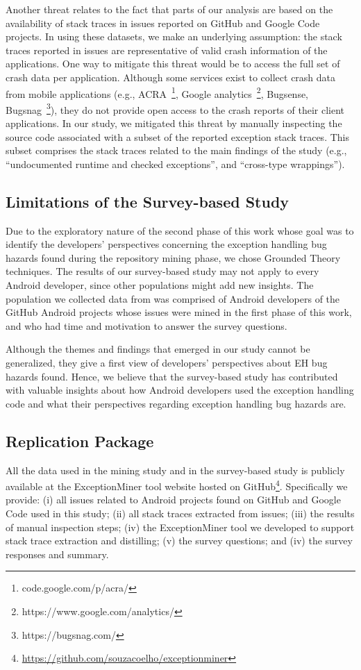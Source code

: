 Another threat relates to the fact that parts of our analysis 
are based on the availability of stack traces in issues reported on GitHub and Google Code projects. 
In using these datasets, we make an underlying assumption: the stack traces reported in issues are 
representative of valid crash information of the applications. 
One way to mitigate this threat would be to access the full 
set of crash data per application. Although some services exist 
to collect crash data from mobile applications (e.g., ACRA~\footnote{code.google.com/p/acra/},  Google analytics~\footnote{https://www.google.com/analytics/}, Bugsense, Bugsnag~\footnote{https://bugsnag.com/}),
they do not provide open access to the crash reports of their client applications.
In our study, we mitigated this threat by manually inspecting
the source code associated with a subset of the reported exception stack traces.
This subset comprises the stack traces related to the main findings 
of the study (e.g., ``undocumented runtime and checked exceptions'',
and ``cross-type wrappings'').

\subsection{Limitations of the Survey-based Study}
Due to the exploratory nature of the second phase of this work whose 
goal was to identify the developers' perspectives concerning the exception 
handling bug hazards found during the repository mining 
phase, we chose Grounded Theory techniques. The results of our
survey-based study may not apply to every Android developer, since other populations 
might add new insights.  The population we collected data from was comprised 
of Android developers of the GitHub 
Android projects whose issues were mined in the first phase of this work, and who had
time and motivation to answer the survey questions.

Although the themes and findings that emerged in our study cannot 
be generalized, they give a first view of developers' perspectives about
 EH bug hazards found. Hence, we believe that the survey-based study 
has contributed with valuable insights about how Android developers 
used the exception handling code and what their perspectives regarding
exception handling bug hazards are.

\subsection{Replication Package}
All the data used in the mining study and in the survey-based study is publicly 
available at the ExceptionMiner tool website hosted on GitHub\footnote{\url{https://github.com/souzacoelho/exceptionminer}}.
Specifically we provide: (i) all issues related to Android projects found
on GitHub and Google Code used in this study; (ii) all stack traces extracted
from issues; (iii) the results of manual inspection steps; (iv) the
ExceptionMiner tool we developed to support stack trace extraction and distilling; 
(v) the survey questions; and (iv) the survey responses and summary.



